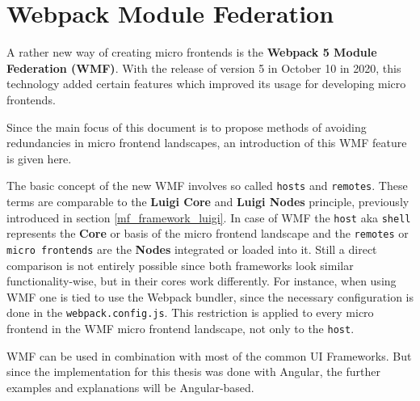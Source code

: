 \section{Webpack Module Federation}
\label{wmf_chap_2}

A rather new way of creating micro frontends is the \textbf{Webpack 5 Module Federation (WMF)}. With the release of version 5 in October 10 in 2020, this technology added certain features which improved its usage for developing micro frontends.\cite{wmf_concepts}

Since the main focus of this document is to propose methods of avoiding redundancies in micro frontend landscapes, an introduction of this WMF feature is given here.

The basic concept of the new WMF involves so called \texttt{hosts} and \texttt{remotes}. These terms are comparable to the \textbf{Luigi Core} and \textbf{Luigi Nodes} principle, previously introduced in section \ref{mf_framework_luigi}. In case of WMF the \texttt{host} aka \texttt{shell} represents the \textbf{Core} or basis of the micro frontend landscape and the \texttt{remotes} or \texttt{micro frontends} are the \textbf{Nodes} integrated or loaded into it. 
Still a direct comparison is not entirely possible since both frameworks look similar functionality-wise, but in their cores work differently. For instance, when using WMF one is tied to use the Webpack bundler, since the necessary configuration is done in the \texttt{webpack.config.js}. This restriction is applied to every micro frontend in the WMF micro frontend landscape, not only to the \texttt{host}.

WMF can be used in combination with most of the common UI Frameworks. But since the implementation for this thesis was done with Angular, the further examples and explanations will be Angular-based.

